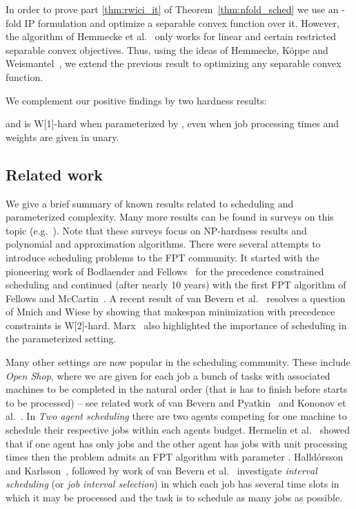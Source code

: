 \documentclass{llncs}
\newcommand{\FPT}{{\sf FPT}\xspace}
\newcommand{\NP}{{\sf NP}\xspace}
\newcommand{\W}[1]{{\sf W}[#1]\xspace}
\begin{document}
In order to prove part \eqref{thm:rwici_it} of Theorem~\ref{thm:nfold_sched} we use an -fold IP formulation and optimize a separable convex function over it. However, the algorithm of Hemmecke et al.~\cite{HemmeckeOR:13} only works for linear and certain restricted separable convex objectives. Thus, using the ideas of Hemmecke, Köppe and Weismantel~\cite{HemmeckeKW14}, we extend the previous result to optimizing any separable convex function.

We complement our positive findings by two hardness results:

\begin{theorem}\label{thm:sched_hardness}
 and  is \W{1}-hard when parameterized by , even when job processing times and weights are given in unary.
\end{theorem}

\subsection{Related work}
We give a brief summary of known results related to scheduling and parameterized complexity. Many more results can be found in surveys on this topic (e.g.~\cite{LawlerLKS:93}). Note that these surveys focus on \NP-hardness results and polynomial and approximation algorithms. There were several attempts to introduce scheduling problems to the \FPT community. It started with the pioneering work of Bodlaender and Fellows~\cite{BodlaenderF95} for the precedence constrained scheduling and continued (after nearly 10 years) with the first \FPT algorithm of Fellows and McCartin~\cite{FellowsM03}. A recent result of van Bevern et al.~\cite{BevernBBKTW16} resolves a question of Mnich and Wiese by showing that makespan minimization with precedence constraints  is \W{2}-hard. Marx~\cite{Marx:09Dagstuhl,Marx:11Dagstuhl} also highlighted the importance of scheduling in the parameterized setting.

Many other settings are now popular in the scheduling community. These include {\em Open Shop}, where we are given for each job  a bunch of tasks  with associated machines  to be completed in the natural order (that is  has to finish before  starts to be processed) -- see related work of van Bevern and Pyatkin~\cite{BevernP16} and Kononov et al.~\cite{KononovSS12}. In {\em Two agent scheduling} there are two agents competing for one machine to schedule their respective jobs within each agents budget. Hermelin et al.~\cite{HermelinKSTW15} showed that if one agent has only  jobs and the other agent has jobs with unit processing times then the problem admits an \FPT algorithm with parameter . Halldórsson and Karlsson~\cite{HalldorssonK06}, followed by work of van Bevern et al.~\cite{DBLP:journals/scheduling/BevernMNW15,BevernNS15} investigate {\em interval scheduling} (or \textit{job interval selection}) in which each job has several time slots in which it may be processed and the task is to schedule as many jobs as possible.
\end{document}
